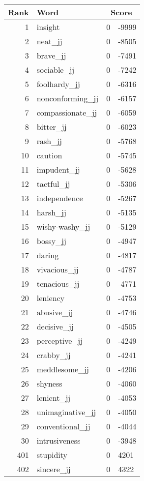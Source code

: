 \begin{longtable}[!htbp]{| rlr@{.}l |}
    \hline
    \textbf{Rank} & \textbf{Word} & \multicolumn{2}{c|}{\textbf{Score}} \\
    \hline
    \endhead
    1 & insight & 0 & -9999 \\
    2 & neat\_jj & 0 & -8505 \\
    3 & brave\_jj & 0 & -7491 \\
    4 & sociable\_jj & 0 & -7242 \\
    5 & foolhardy\_jj & 0 & -6316 \\
    6 & nonconforming\_jj & 0 & -6157 \\
    7 & compassionate\_jj & 0 & -6059 \\
    8 & bitter\_jj & 0 & -6023 \\
    9 & rash\_jj & 0 & -5768 \\
    10 & caution & 0 & -5745 \\
    11 & impudent\_jj & 0 & -5628 \\
    12 & tactful\_jj & 0 & -5306 \\
    13 & independence & 0 & -5267 \\
    14 & harsh\_jj & 0 & -5135 \\
    15 & wishy-washy\_jj & 0 & -5129 \\
    16 & bossy\_jj & 0 & -4947 \\
    17 & daring & 0 & -4817 \\
    18 & vivacious\_jj & 0 & -4787 \\
    19 & tenacious\_jj & 0 & -4771 \\
    20 & leniency & 0 & -4753 \\
    21 & abusive\_jj & 0 & -4746 \\
    22 & decisive\_jj & 0 & -4505 \\
    23 & perceptive\_jj & 0 & -4249 \\
    24 & crabby\_jj & 0 & -4241 \\
    25 & meddlesome\_jj & 0 & -4206 \\
    26 & shyness & 0 & -4060 \\
    27 & lenient\_jj & 0 & -4053 \\
    28 & unimaginative\_jj & 0 & -4050 \\
    29 & conventional\_jj & 0 & -4044 \\
    30 & intrusiveness & 0 & -3948 \\
    401 & stupidity & 0 & 4201 \\
    402 & sincere\_jj & 0 & 4322 \\

\end{longtable}

